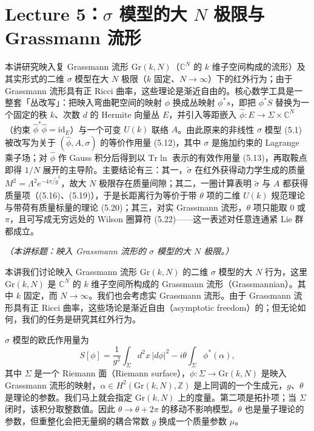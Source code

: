 \section{Lecture 5：$\sigma$ 模型的大 $N$ 极限与 Grassmann 流形}

\begin{keytakeaways}
本讲研究映入复 Grassmann 流形 $\mathrm{Gr}(k,N)$（$\mathbb{C}^N$ 的 $k$ 维子空间构成的流形）及其实形式的二维 $\sigma$ 模型在大 $N$ 极限（$k$ 固定、$N\to\infty$）下的红外行为；由于 Grassmann 流形具有正 Ricci 曲率，这些理论是渐近自由的。核心数学工具是一整套「丛改写」：把映入弯曲靶空间的映射 $\phi$ 换成丛映射 $\phi^*s$，即把 $\phi^*S$ 替换为一个固定的秩 $k$、次数 $d$ 的 Hermite 向量丛 $E$，并引入等距嵌入 $\hat\phi:E\to\Sigma\times\mathbb{C}^N$（约束 $\hat\phi^*\hat\phi=\mathrm{id}_E$）与一个可变 $U(k)$ 联络 $A$。由此原来的非线性 $\sigma$ 模型 (5.1) 被改写为关于 $(\hat\phi,A,\sigma)$ 的等价作用量 (5.12)，其中 $\sigma$ 是施加约束的 Lagrange 乘子场；对 $\hat\phi$ 作 Gauss 积分后得到以 $\mathrm{Tr}\ln$ 表示的有效作用量 (5.13)，再取鞍点即得 $1/N$ 展开的主导阶。主要结论有三：其一，$\tilde\sigma$ 在红外获得动力学生成的质量 $M^2=\Lambda^2e^{-4\pi/\tilde g^2}$，故大 $N$ 极限存在质量间隙；其二，一圈计算表明 $\tilde\sigma$ 与 $A$ 都获得质量项（(5.16)、(5.19)），于是长距离行为等价于带 $\theta$ 项的二维 $U(k)$ 规范理论与带荷有质量标量的理论 (5.20)；其三，对实 Grassmann 流形，$\theta$ 项只能取 $0$ 或 $\pi$，且可写成无穷远处的 Wilson 圈算符 (5.22)——这一表述对任意连通紧 Lie 群都成立。
\end{keytakeaways}

\noindent\textit{（本讲标题：映入 Grassmann 流形的 $\sigma$ 模型的大 $N$ 极限。）}

本讲我们讨论映入 Grassmann 流形 $\mathrm{Gr}(k,N)$ 的二维 $\sigma$ 模型的大 $N$ 行为，这里 $\mathrm{Gr}(k,N)$ 是 $\mathbb{C}^N$ 的 $k$ 维子空间所构成的 Grassmann 流形（Grassmannian）。其中 $k$ 固定，而 $N\to\infty$。我们也会考虑实 Grassmann 流形。由于 Grassmann 流形具有正 Ricci 曲率，这些场论是渐近自由（asymptotic freedom）的；但无论如何，我们的任务是研究其红外行为。

$\sigma$ 模型的欧氏作用量为
\begin{equation}
  \tag{5.1}
  \label{eq:5-1}
  S[\phi]=\frac{1}{g^2}\int_\Sigma d^2x\,|d\phi|^2-i\theta\int_\Sigma \phi^*(\alpha),
\end{equation}
其中 $\Sigma$ 是一个 Riemann 面（Riemann surface），$\phi:\Sigma\to\mathrm{Gr}(k,N)$ 是映入 Grassmann 流形的映射，$\alpha\in H^2(\mathrm{Gr}(k,N),\mathbb{Z})$ 是上同调的一个生成元，$g$、$\theta$ 是理论的参数。我们马上就会指定 $\mathrm{Gr}(k,N)$ 上的度量。第二项是拓扑项；当 $\Sigma$ 闭时，该积分取整数值。因此 $\theta\to\theta+2\pi$ 的移动不影响模型。$\theta$ 也是量子理论的参数，但重整化会把无量纲的耦合常数 $g$ 换成一个质量参数 $\mu$。

